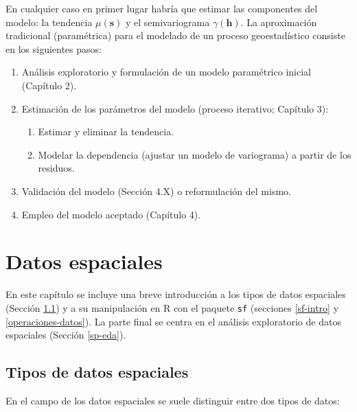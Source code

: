 \documentclass[
  spanish,
]{book}
\theoremstyle{break}
\begin{document}
En cualquier caso en primer lugar habría que estimar las componentes del modelo: la tendencia \(\mu(\mathbf{s})\) y el semivariograma \(\gamma(\mathbf{h})\).
La aproximación tradicional (paramétrica) para el modelado de un proceso geoestadístico consiste en los siguientes pasos:

\begin{enumerate}
\def\labelenumi{\arabic{enumi}.}
\item
  Análisis exploratorio y formulación de un modelo paramétrico inicial (Capítulo 2).
\item
  Estimación de los parámetros del modelo (proceso iterativo; Capítulo 3):

  \begin{enumerate}
  \def\labelenumii{\arabic{enumii}.}
  \item
    Estimar y eliminar la tendencia.
  \item
    Modelar la dependencia (ajustar un modelo de variograma) a partir de los residuos.
  \end{enumerate}
\item
  Validación del modelo (Sección 4.X) o reformulación del mismo.
\item
  Empleo del modelo aceptado (Capítulo 4).
\end{enumerate}

\hypertarget{datos}{%
\chapter{Datos espaciales}\label{datos}}

En este capítulo se incluye una breve introducción a los tipos de datos espaciales (Sección \ref{datos-tipos}) y a su manipulación en R con el paquete \texttt{sf} (secciones \ref{sf-intro} y \ref{operaciones-datos}).
La parte final se centra en el análisis exploratorio de datos espaciales (Sección \ref{sp-eda}).

\hypertarget{datos-tipos}{%
\section{Tipos de datos espaciales}\label{datos-tipos}}

En el campo de los datos espaciales se suele distinguir entre dos tipos de datos:
\end{document}
